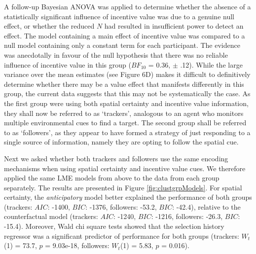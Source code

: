 \documentclass[11pt,halfline,a4paper,]{ouparticle}
\begin{document}
A follow-up Bayesian ANOVA was applied to determine whether the absence of a statistically significant influence of incentive value was due to a genuine null effect, or whether the reduced \(N\) had resulted in insufficient power to detect an effect. The model containing a main effect of incentive value was compared to a null model containing only a constant term for each participant. The evidence was anecdotally in favour of the null hypothesis that there was no reliable influence of incentive value in this group (\(BF_{10}\) = 0.36, \(\pm\) .12). While the large variance over the mean estimates (see Figure 6D) makes it difficult to definitively determine whether there may be a value effect that manifests differently in this group, the current data suggests that this may not be systematically the case. As the first group were using both spatial certainty and incentive value information, they shall now be referred to as `trackers', analogous to an agent who monitors multiple environmental cues to find a target. The second group shall be referred to as `followers', as they appear to have formed a strategy of just responding to a single source of information, namely they are opting to follow the spatial cue.

Next we asked whether both trackers and followers use the same encoding mechanisms when using spatial certainty and incentive value cues. We therefore applied the same LME models from above to the data from each group separately. The results are presented in Figure \ref{fig:clustgrpModels}. For spatial certainty, the \emph{anticipatory} model better explained the performance of both groups (trackers: \(AIC\): -1400, \(BIC\): -1376, followers: -53.2, \(BIC\): -42.4), relative to the counterfactual model (trackers: \(AIC\): -1240, \(BIC\): -1216, followers: -26.3, \(BIC\): -15.4). Moreover, Wald chi square tests showed that the selection history regressor was a significant predictor of performance for both groups (trackers: \(W_{t}\)(1) = 73.7, \(p\) = 9.03e-18, followers: \(W_{t}\)(1) = 5.83, \(p\) = 0.016).
\end{document}

